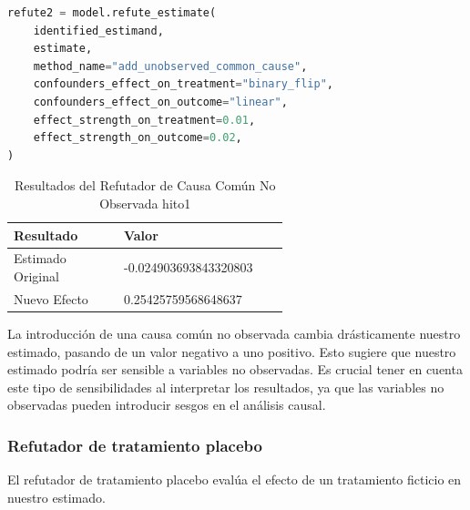 \begin{minipage}{0.5\textwidth}
    \begin{lstlisting}[language=Python, caption=Refutador de causa común no observada hito1, label=lst:RefutadorCausaComúnNoObservadaHito1]
refute2 = model.refute_estimate(
    identified_estimand,
    estimate,
    method_name="add_unobserved_common_cause",
    confounders_effect_on_treatment="binary_flip",
    confounders_effect_on_outcome="linear",
    effect_strength_on_treatment=0.01,
    effect_strength_on_outcome=0.02,
)
\end{lstlisting}
\end{minipage}
\hfill
\begin{minipage}{0.45\textwidth}
    \begin{table}[H]
        \centering
        \begin{tabular}{lp{0.6\linewidth}}
            \toprule
            \textbf{Resultado} & \textbf{Valor} \\
            \midrule
            Estimado Original & -0.024903693843320803 \\
            Nuevo Efecto & 0.25425759568648637 \\
            \bottomrule
        \end{tabular}
        \caption{Resultados del Refutador de Causa Común No Observada hito1}
        \label{tab:refutador_causa_no_observada_hito1}
    \end{table}
\end{minipage}

La introducción de una causa común no observada cambia drásticamente nuestro estimado, pasando de un valor negativo a uno positivo. Esto sugiere que nuestro estimado podría ser sensible a variables no observadas. Es crucial tener en cuenta este tipo de sensibilidades al interpretar los resultados, ya que las variables no observadas pueden introducir sesgos en el análisis causal.

\subsubsection{Refutador de tratamiento placebo}

El refutador de tratamiento placebo evalúa el efecto de un tratamiento ficticio en nuestro estimado.

